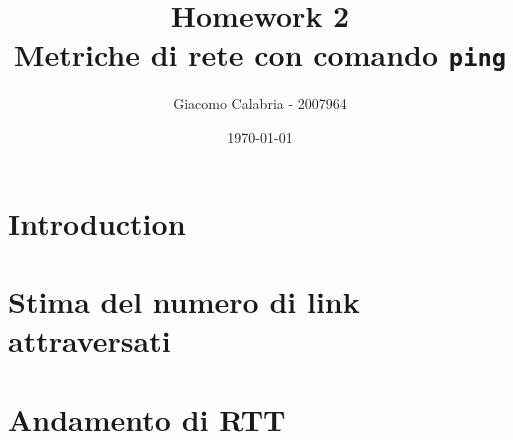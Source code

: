 \documentclass{article}
\title{Homework 2\\\textbf{Metriche di rete con comando \texttt{ping}}}
\author{Giacomo Calabria - 2007964}
\date{\today}
\begin{document}
    \maketitle
    \section{Introduction}
    
    
    \section{Stima del numero di link attraversati}\label{ch:link}
    
    \clearpage

    \section{Andamento di RTT}
    
\end{document}
